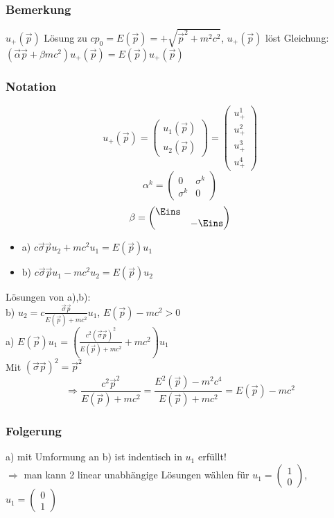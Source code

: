 \documentclass[twoside,a4paper]{scrartcl}
\renewcommand{\1}{\mathds{1}}
\newcommand{\Ra}{\Rightarrow}
\begin{document}
\subsubsection*{Bemerkung}
$u_+(\vec p)$ Lösung zu $cp_0=E(\vec p)=+\sqrt{\vec p^2+m^2c^2}$, $u_+(\vec p)$ löst Gleichung: $(\vec \alpha \vec p+\beta mc^2)u_+(\vec p)=E(\vec p)u_+(\vec p)$
\subsubsection*{Notation}
$$u_+(\vec p)=\begin{pmatrix}u_1(\vec p) \\ u_2(\vec p) \end{pmatrix}=\begin{pmatrix}u^1_+ \\ u^2_+ \\ u^3_+ \\ u^4_+ \end{pmatrix}$$
$$\alpha^k=\begin{pmatrix}0 & \sigma^k \\ \sigma^k & 0 \end{pmatrix}$$
$$\beta=\begin{pmatrix}\Eins \\  & -\Eins \end{pmatrix}$$
\begin{itemize}
\item a) $c\vec \sigma \vec p u_2+mc^2 u_1=E(\vec p)u_1$
\item b) $c\vec \sigma \vec p u_1-mc^2 u_2=E(\vec p)u_2$
\end{itemize}
Lösungen von a),b):\\
b) $u_2=c\frac{\vec \sigma \vec p}{E(\vec p)+mc^2}u_1$, $ E(\vec p)-mc^2>0$\\
a) $E(\vec p)u_1=(\frac{c^2(\vec\sigma\vec p)^2}{E(\vec p)+mc^2}+mc^2)u_1$\\
Mit $(\vec \sigma \vec p)^2=\vec p^2$
$$\Ra \frac{c^2\vec p^2}{E(\vec p)+mc^2}=\frac{E^2(\vec p)-m^2c^4}{E(\vec p)+mc^2}=E(\vec p)-mc^2$$
\subsubsection*{Folgerung}
a) mit Umformung an b) ist indentisch in $u_1$ erfüllt!\\
$\Ra$ man kann 2 linear unabhängige Lösungen wählen für $u_1=\begin{pmatrix}1 \\ 0\end{pmatrix}$, $u_1=\begin{pmatrix}0 \\ 1\end{pmatrix}$
\end{document}
